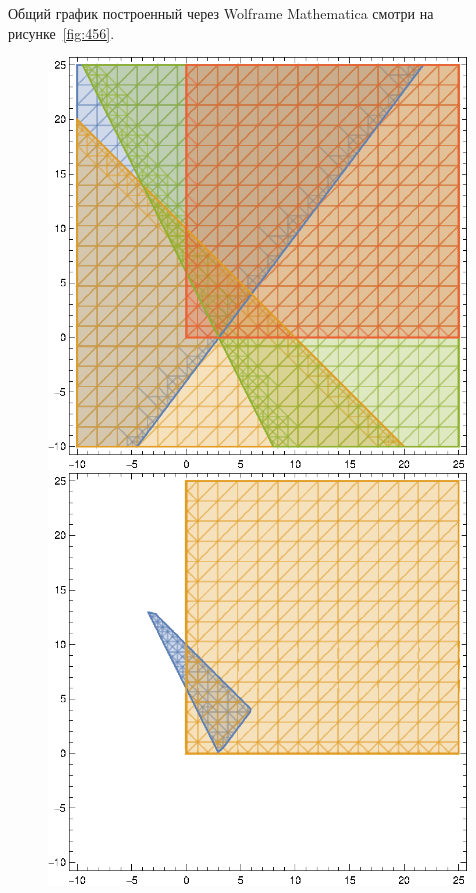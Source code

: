 Общий график построенный через Wolframe Mathematica \cite{WolframeMathematica} смотри на рисунке~\ref{fig:456}.

\begin{figure}[!htb]\centering
  \begin{minipage}{0.32\textwidth}
    \centering

    \includegraphics[width=0.99\textwidth]
    {inc/4.eps}
  \end{minipage}
  \begin{minipage}{0.32\textwidth}
    \centering

    \includegraphics[width=0.99\textwidth]
    {inc/5.eps}
  \end{minipage}
  \begin{minipage}{0.32\textwidth}
    \centering


\end{minipage}
\end{figure}
